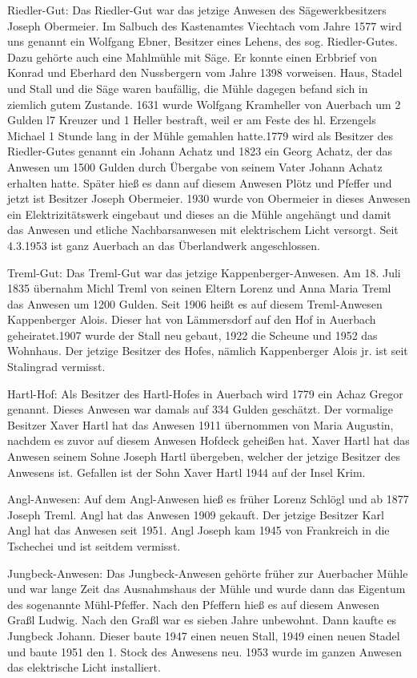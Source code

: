 Riedler-Gut: Das Riedler-Gut war das jetzige Anwesen des Sägewerkbesitzers
Joseph Obermeier. Im Salbuch des Kastenamtes Viechtach vom Jahre 1577 wird uns
genannt ein Wolfgang Ebner, Besitzer eines Lehens, des sog. Riedler-Gutes. Dazu
gehörte auch eine Mahlmühle mit Säge. Er konnte einen Erbbrief von Konrad und
Eberhard den Nussbergern vom Jahre 1398 vorweisen. Haus, Stadel und Stall und
die Säge waren baufällig, die Mühle dagegen befand sich in ziemlich gutem
Zustande. 1631 wurde Wolfgang Kramheller von Auerbach um 2 Gulden l7 Kreuzer und
1 Heller bestraft, weil er am Feste des hl. Erzengels Michael 1 Stunde lang in
der Mühle gemahlen hatte.1779 wird als Besitzer des Riedler-Gutes genannt ein
Johann Achatz und 1823 ein Georg Achatz, der das Anwesen um 1500 Gulden durch
Übergabe von seinem Vater Johann Achatz erhalten hatte. Später hieß es dann auf
diesem Anwesen Plötz und Pfeffer und jetzt ist Besitzer Joseph Obermeier. 1930
wurde von Obermeier in dieses Anwesen ein Elektrizitätswerk eingebaut und dieses
an die Mühle angehängt und damit das Anwesen und etliche Nachbarsanwesen mit
elektrischem Licht versorgt. Seit 4.3.1953 ist ganz Auerbach an das Überlandwerk
angeschlossen.

Treml-Gut: Das Treml-Gut war das jetzige Kappenberger-Anwesen. Am 18. Juli 1835
übernahm Michl Treml von seinen Eltern Lorenz und Anna Maria Treml das Anwesen
um 1200 Gulden. Seit 1906 heißt es auf diesem Treml-Anwesen Kappenberger Alois.
Dieser hat von Lämmersdorf auf den Hof in Auerbach geheiratet.1907 wurde der
Stall neu gebaut, 1922 die Scheune und 1952 das Wohnhaus. Der jetzige Besitzer
des Hofes, nämlich Kappenberger Alois jr. ist seit Stalingrad vermisst.

Hartl-Hof: Als Besitzer des Hartl-Hofes in Auerbach wird 1779 ein Achaz Gregor
genannt. Dieses Anwesen war damals auf 334 Gulden geschätzt. Der vormalige
Besitzer Xaver Hartl hat das Anwesen 1911 übernommen von Maria Augustin, nachdem
es zuvor auf diesem Anwesen Hofdeck geheißen hat. Xaver Hartl hat das Anwesen
seinem Sohne Joseph Hartl übergeben, welcher der jetzige Besitzer des Anwesens
ist. Gefallen ist der Sohn Xaver Hartl 1944 auf der Insel Krim.

Angl-Anwesen: Auf dem Angl-Anwesen hieß es früher Lorenz Schlögl und ab 1877
Joseph Treml. Angl hat das Anwesen 1909 gekauft. Der jetzige Besitzer Karl Angl
hat das Anwesen seit 1951. Angl Joseph kam 1945 von Frankreich in die Tschechei
und ist seitdem vermisst.

Jungbeck-Anwesen: Das Jungbeck-Anwesen gehörte früher zur Auerbacher Mühle und
war lange Zeit das Ausnahmshaus der Mühle und wurde dann das Eigentum des
sogenannte Mühl-Pfeffer. Nach den Pfeffern hieß es auf diesem Anwesen Graßl
Ludwig. Nach den Graßl war es sieben Jahre unbewohnt. Dann kaufte es Jungbeck
Johann. Dieser baute 1947 einen neuen Stall, 1949 einen neuen Stadel und baute
1951 den 1. Stock des Anwesens neu. 1953 wurde im ganzen Anwesen das elektrische
Licht installiert.

